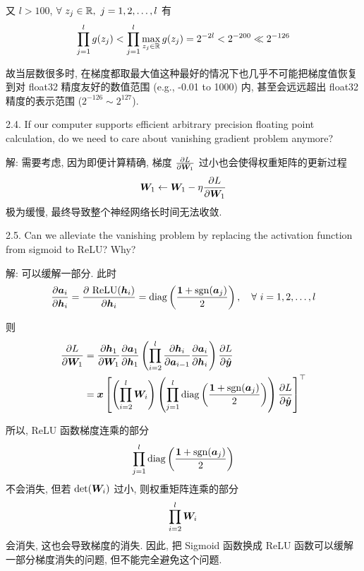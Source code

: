 \documentclass{article}
\begin{document}
又 $l>100$, $\forall~z_j\in\mathbb{R},~j=1,2,\dots,l$ 有
\begin{equation}
  \prod_{j=1}^l g(z_j)<\prod_{j=1}^l \max_{z_j\in\mathbb{R}}g(z_j)=2^{-2l}<2^{-200}\ll2^{-126}
\end{equation}

故当层数很多时, 在梯度都取最大值这种最好的情况下也几乎不可能把梯度值恢复到对 float32 精度友好的数值范围 (e.g., -0.01 to 1000) 内, 甚至会远远超出 float32 精度的表示范围 ($2^{-126}\sim2^{127}$).

2.4. If our computer supports efficient arbitrary precision floating point calculation, do we need to care about vanishing gradient problem anymore?

解: 需要考虑, 因为即便计算精确, 梯度 $\frac{\partial L}{\partial \bm{W}_1}$ 过小也会使得权重矩阵的更新过程
\begin{equation}
  \bm{W}_1\leftarrow\bm{W}_1-\eta\frac{\partial L}{\partial \bm{W}_1}
\end{equation} 
极为缓慢, 最终导致整个神经网络长时间无法收敛.

2.5. Can we alleviate the vanishing problem by replacing the activation function from sigmoid to ReLU? Why?

解: 可以缓解一部分. 此时
\begin{equation}
  \frac{\partial\bm{a}_i}{\partial\bm{h}_i}=\frac{\partial~\mathrm{ReLU}(\bm{h}_i)}{\partial\bm{h}_i}=\operatorname{diag}\left(\frac{\bm{1}+\operatorname{sgn}(\bm{a}_j)}{2}\right),\quad\forall~i=1,2,\dots,l
\end{equation}

则
\begin{equation}
  \begin{aligned}
    \frac{\partial L}{\partial\bm{W}_1}
    &=\frac{\partial\bm{h}_1}{\partial\bm{W}_1}
    \frac{\partial\bm{a}_{1}}{\partial\bm{h}_{1}}
    \left(\prod_{i=2}^l\frac{\partial\bm{h}_i}{\partial\bm{a}_{i-1}}
    \frac{\partial\bm{a}_{i}}{\partial\bm{h}_{i}}\right)
    \frac{\partial L}{\partial\hat{\bm{y}}}\\
    &=\bm{x}\left[
      \left(\prod_{i=2}^l\bm{W}_i\right)\left(\prod_{j=1}^l\operatorname{diag}\left(\frac{\bm{1}+\operatorname{sgn}(\bm{a}_j)}{2}\right)\right)
      \frac{\partial L}{\partial\hat{\bm{y}}}
    \right]^\top\\
  \end{aligned}
\end{equation}

所以, ReLU 函数梯度连乘的部分 $$\prod_{j=1}^l\operatorname{diag}\left(\frac{\bm{1}+\operatorname{sgn}(\bm{a}_j)}{2}\right)$$ 不会消失, 但若 $\det(\bm{W}_i)$ 过小, 则权重矩阵连乘的部分 $$\prod_{i=2}^l\bm{W}_i$$ 会消失, 这也会导致梯度的消失. 因此, 把 Sigmoid 函数换成 ReLU 函数可以缓解一部分梯度消失的问题, 但不能完全避免这个问题.
\end{document}
